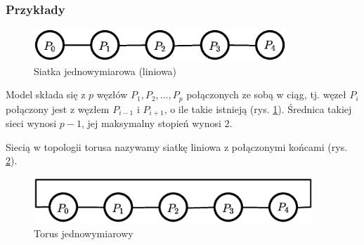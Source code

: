 



\subsubsection{Przykłady}
\begin{przyklad}
\begin{figure}[h]
\centering
\includegraphics[width=9.5cm]{images/mesh1d}
\caption{Siatka jednowymiarowa (liniowa)}
\label{fig:model_mesh1d}
\end{figure}
Model składa się z \(p\) węzłów \(P_1, P_2, \dots, P_p\) połączonych ze sobą w ciąg, tj. węzeł \(P_i\) połączony jest z węzłem \(P_{i-1}\) i \(P_{i+1}\), o ile takie istnieją (rys. \ref{fig:model_mesh1d}). Średnica takiej sieci wynosi \(p-1\), jej maksymalny stopień wynosi \(2\).\\
\end{przyklad}

\begin{przyklad}[Torus]
Siecią w topologii torusa nazywamy siatkę liniowa z połączonymi końcami (rys. \ref{fig:model_torus1d}).
\begin{figure}[h]
\centering
\includegraphics[width=10.5cm]{images/torus1d}
\caption{Torus jednowymiarowy}
\label{fig:model_torus1d}
\end{figure}
\end{przyklad}

